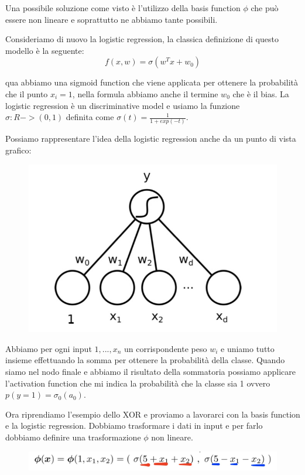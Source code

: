 \documentclass[14pt]{extreport}
\begin{document}
Una possibile soluzione come visto è l'utilizzo della basis function $\phi$ che può essere non lineare e soprattutto ne abbiamo tante possibili.

Consideriamo di nuovo la logistic regression, la classica definizione di questo modello è la seguente:
$$f(x,w) = \sigma(w^Tx + w_0)$$

qua abbiamo una sigmoid function che viene applicata per ottenere la probabilità che il punto $x_i=1$, nella formula abbiamo anche il termine $w_0$
che è il bias. La logistic regression è un discriminative model e usiamo la funzione $\sigma: R->(0,1)$ definita come $\sigma(t) =
\frac{1}{1+exp(-t)}$.

Possiamo rappresentare l'idea della logistic regression anche da un punto di vista grafico:

\begin{figure}[H]
\centering
\includegraphics[width=0.7\linewidth]{359.jpeg}
\end{figure}

Abbiamo per ogni input $1,...,x_n$ un corrispondente peso $w_i$ e uniamo tutto insieme effettuando la somma per ottenere la probabilità della classe.
Quando siamo nel nodo finale e abbiamo il risultato della sommatoria possiamo applicare l'activation function che mi indica la probabilità che la
classe sia 1 ovvero $p(y=1)=\sigma_0(a_0)$.

Ora riprendiamo l'esempio dello XOR e proviamo a lavorarci con la basis function e la logistic regression. Dobbiamo trasformare i dati in input e per
farlo dobbiamo definire una trasformazione $\phi$ non lineare.

\begin{figure}[H]
\centering
\includegraphics[width=0.7\linewidth]{360.jpeg}
\end{figure}
\end{document}
